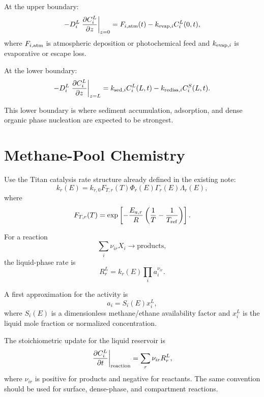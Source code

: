 \documentclass[11pt]{article}
\begin{document}
At the upper boundary:
\begin{equation}
-D_i^L\left.\frac{\partial C_i^L}{\partial z}\right|_{z=0}
=
F_{i,\rm atm}(t)
-k_{{\rm evap},i}C_i^L(0,t),
\end{equation}
where $F_{i,\rm atm}$ is atmospheric deposition or photochemical feed and $k_{{\rm evap},i}$ is evaporative or escape loss.

At the lower boundary:
\begin{equation}
-D_i^L\left.\frac{\partial C_i^L}{\partial z}\right|_{z=L}
=
k_{{\rm sed},i}C_i^L(L,t)
-k_{{\rm rediss},i}C_i^S(L,t).
\end{equation}

This lower boundary is where sediment accumulation, adsorption, and dense organic phase nucleation are expected to be strongest.

\section{Methane-Pool Chemistry}

Use the Titan catalysis rate structure already defined in the existing note:
\begin{equation}
k_r(E)
= k_{r,0} F_{T,r}(T) \Phi_r(E) \Gamma_r(E) \Lambda_r(E),
\end{equation}
where
\begin{equation}
F_{T,r}(T)
=
\exp\left[
-\frac{E_{a,r}}{R}
\left(
\frac{1}{T}-\frac{1}{T_{\rm ref}}
\right)
\right].
\end{equation}

For a reaction
\begin{equation}
\sum_i \nu_{ir} X_i \rightarrow \text{products},
\end{equation}
the liquid-phase rate is
\begin{equation}
R_r^L = k_r(E) \prod_i a_i^{\nu_{ir}}.
\end{equation}

A first approximation for the activity is
\begin{equation}
a_i = S_i(E) x_i^L,
\end{equation}
where $S_i(E)$ is a dimensionless methane/ethane availability factor and $x_i^L$ is the liquid mole fraction or normalized concentration.

The stoichiometric update for the liquid reservoir is
\begin{equation}
\left.\frac{\partial C_i^L}{\partial t}\right|_{\rm reaction}
=
\sum_r \nu_{ir} R_r^L,
\end{equation}
where $\nu_{ir}$ is positive for products and negative for reactants. The same convention should be used for surface, dense-phase, and compartment reactions.
\end{document}
